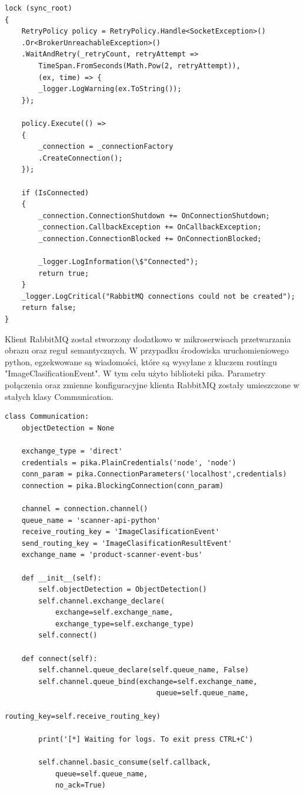\begin{lstlisting}[caption={Metoda połączenia klienta RabbitMQ.} ]
lock (sync_root)
{
	RetryPolicy policy = RetryPolicy.Handle<SocketException>()
	.Or<BrokerUnreachableException>()
	.WaitAndRetry(_retryCount, retryAttempt => 
		TimeSpan.FromSeconds(Math.Pow(2, retryAttempt)), 
		(ex, time) => {
		_logger.LogWarning(ex.ToString());
	});
	
	policy.Execute(() =>
	{
		_connection = _connectionFactory
		.CreateConnection();
	});
	
	if (IsConnected)
	{
		_connection.ConnectionShutdown += OnConnectionShutdown;
		_connection.CallbackException += OnCallbackException;
		_connection.ConnectionBlocked += OnConnectionBlocked;
		
		_logger.LogInformation(\$"Connected");		
		return true;
	}
	_logger.LogCritical("RabbitMQ connections could not be created");	
	return false;
}

\end{lstlisting}

Klient RabbitMQ został stworzony dodatkowo w mikroserwisach przetwarzania obrazu oraz reguł semantycznych. W przypadku środowiska uruchomieniowego python, egzekwowane są wiadomości, które są wysyłane z kluczem routingu "ImageClasificationEvent". W tym celu użyto biblioteki pika. Parametry połączenia oraz zmienne konfiguracyjne klienta RabbitMQ zostały umieszczone w stałych klasy Communication.

\begin{lstlisting}[caption={Klient RabbitMQ dla mikroserwisu przetwarzania obrazu.}]
class Communication:
	objectDetection = None
	
	exchange_type = 'direct'
	credentials = pika.PlainCredentials('node', 'node')
	conn_param = pika.ConnectionParameters('localhost',credentials)
	connection = pika.BlockingConnection(conn_param)

	channel = connection.channel()
	queue_name = 'scanner-api-python'
	receive_routing_key = 'ImageClasificationEvent'
	send_routing_key = 'ImageClasificationResultEvent'
	exchange_name = 'product-scanner-event-bus'
	
	def __init__(self):
		self.objectDetection = ObjectDetection()
		self.channel.exchange_declare(
			exchange=self.exchange_name,
			exchange_type=self.exchange_type)
		self.connect()
	
	def connect(self):
		self.channel.queue_declare(self.queue_name, False)
		self.channel.queue_bind(exchange=self.exchange_name,
									queue=self.queue_name,
									routing_key=self.receive_routing_key)
	
		print('[*] Waiting for logs. To exit press CTRL+C')
	
		self.channel.basic_consume(self.callback,
			queue=self.queue_name,
			no_ack=True)

\end{lstlisting}

